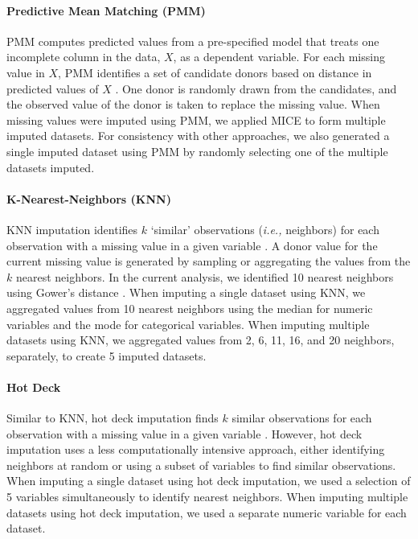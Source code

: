 \documentclass{article}
\begin{document}
\paragraph{Predictive Mean Matching (PMM)}

PMM computes predicted values from a pre-specified model that treats one
incomplete column in the data, \(X\), as a dependent variable. For each
missing value in \(X\), PMM identifies a set of candidate donors based
on distance in predicted values of \(X\) \cite{landerman1997empirical}.
One donor is randomly drawn from the candidates, and the observed value
of the donor is taken to replace the missing value. When missing values
were imputed using PMM, we applied MICE to form multiple imputed
datasets. For consistency with other approaches, we also generated a
single imputed dataset using PMM by randomly selecting one of the
multiple datasets imputed.

\paragraph{K-Nearest-Neighbors (KNN)}

KNN imputation identifies \(k\) `similar' observations
(\textit{i.e., } neighbors) for each observation with a missing value in
a given variable \cite{chen2000nearest}. A donor value for the current
missing value is generated by sampling or aggregating the values from
the \(k\) nearest neighbors. In the current analysis, we identified 10
nearest neighbors using Gower's distance \cite{gower}. When imputing a
single dataset using KNN, we aggregated values from 10 nearest neighbors
using the median for numeric variables and the mode for categorical
variables. When imputing multiple datasets using KNN, we aggregated
values from 2, 6, 11, 16, and 20 neighbors, separately, to create 5
imputed datasets.

\paragraph{Hot Deck}

Similar to KNN, hot deck imputation finds \(k\) similar observations for
each observation with a missing value in a given variable
\cite{andridge2010hotdeck}. However, hot deck imputation uses a less
computationally intensive approach, either identifying neighbors at
random or using a subset of variables to find similar observations. When
imputing a single dataset using hot deck imputation, we used a selection
of 5 variables simultaneously to identify nearest neighbors. When
imputing multiple datasets using hot deck imputation, we used a separate
numeric variable for each dataset.
\end{document}
